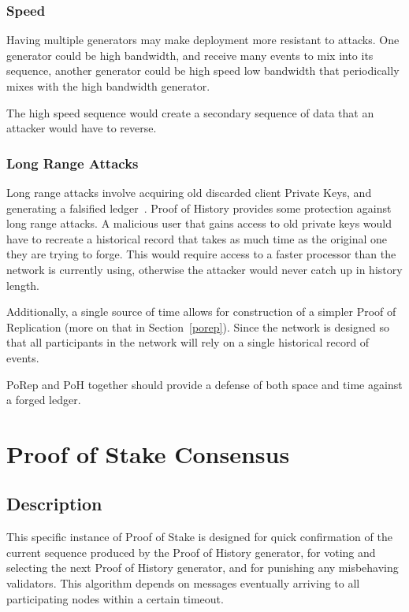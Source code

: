 \documentclass[12pt]{article}
\begin{document}
\subsubsection{Speed}
Having multiple generators may make deployment more resistant to attacks. One generator could be high bandwidth, and receive many events to mix into its sequence, another generator could be high speed low bandwidth that periodically mixes with the high bandwidth generator.

The high speed sequence would create a secondary sequence of data that an attacker would have to reverse.

\subsubsection{Long Range Attacks}

Long range attacks involve acquiring old discarded client Private Keys, and generating a falsified ledger~\cite{casper}. Proof of History provides some protection against long range attacks. A malicious user that gains access to old private keys would have to recreate a historical record that takes as much time as the original one they are trying to forge. This would require access to a faster processor than the network is currently using, otherwise the attacker would never catch up in history length.

Additionally, a single source of time allows for construction of a simpler Proof of Replication (more on that in Section~\ref{porep}). Since the network is designed so that all participants in the network will rely on a single historical record of events.

PoRep and PoH together should provide a defense of both space and time against a forged ledger.


\section{Proof of Stake Consensus}\label{proof_of_stake}
\subsection{Description}
This specific instance of Proof of Stake is designed for quick confirmation of the current sequence produced by the Proof of History generator, for voting and selecting the next Proof of History generator, and for punishing any misbehaving validators. This algorithm depends on messages eventually arriving to all participating nodes within a certain timeout.
\end{document}
